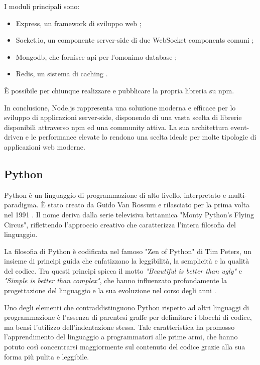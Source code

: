 I moduli principali sono:
\begin{itemize}
  \item Express, un framework di sviluppo web \cite{express_js};
  \item Socket.io, un componente server-side di due WebSocket components comuni \cite{socket_io};
  \item Mongodb, che fornisce \acrshort{api} per l'omonimo database \cite{mongodb};
  \item Redis, un sistema di caching \cite{redis}.
\end{itemize}
È possibile per chiunque realizzare e pubblicare la propria libreria su \acrfull{npm}.

In conclusione, Node.js rappresenta una soluzione moderna e efficace per lo sviluppo di applicazioni server-side,
disponendo di una vasta scelta di librerie disponibili attraverso \acrfull{npm} ed una community attiva.
La sua architettura event-driven e le performance elevate lo rendono una scelta ideale per molte tipologie
di applicazioni web moderne.

\subsection{Python}

Python è un linguaggio di programmazione di alto livello, interpretato e multi-paradigma.
È stato creato da Guido Van Rossum e rilasciato per la prima volta nel 1991 \citep{van_rossum_1995}.
Il nome deriva dalla serie televisiva britannica "Monty Python's Flying Circus", riflettendo l'approccio creativo
che caratterizza l'intera filosofia del linguaggio.

La filosofia di Python è codificata nel famoso "Zen of Python" di Tim Peters, un insieme di principi guida
che enfatizzano la leggibilità, la semplicità e la qualità del codice. Tra questi principi spicca il motto
\textit{"Beautiful is better than ugly"} e \textit{"Simple is better than complex"}, che hanno influenzato profondamente
la progettazione del linguaggio e la sua evoluzione nel corso degli anni \citep{peters_2004}.

Uno degli elementi che contraddistinguono Python rispetto ad altri linguaggi di programmazione è l'assenza di parentesi
graffe per delimitare i blocchi di codice, ma bensì l'utilizzo dell'indentazione stessa. Tale caratteristica ha promosso
l'apprendimento del linguaggio a programmatori alle prime armi, che hanno potuto così concentrarsi maggiormente sul
contenuto del codice grazie alla sua forma più pulita e leggibile.

